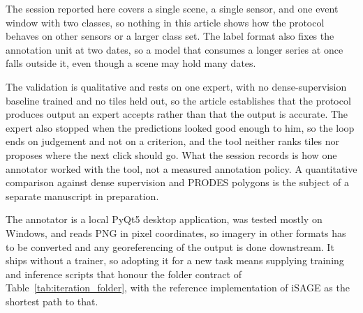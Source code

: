 
The session reported here covers a single scene, a single sensor,
and one event window with two classes, so nothing in this article
shows how the protocol behaves on other sensors or a larger class
set. The label format also fixes the annotation unit at two dates,
so a model that consumes a longer series at once falls outside it,
even though a scene may hold many dates.

The validation is qualitative and rests on one expert, with no
dense-supervision baseline trained and no tiles held out, so the
article establishes that the protocol produces output an expert
accepts rather than that the output is accurate. The expert also
stopped when the predictions looked good enough to him, so the
loop ends on judgement and not on a criterion, and the tool
neither ranks tiles nor proposes where the next click should go.
What the session records is how one annotator worked with the
tool, not a measured annotation policy. A quantitative comparison
against dense supervision and PRODES polygons is the subject of a
separate manuscript in preparation.

The annotator is a local PyQt5 desktop application, was tested
mostly on Windows, and reads PNG in pixel coordinates, so imagery
in other formats has to be converted and any georeferencing of the
output is done downstream. It ships without a trainer, so adopting
it for a new task means supplying training and inference scripts
that honour the folder contract of
Table~\ref{tab:iteration_folder}, with the reference
implementation of iSAGE as the shortest path to that.
